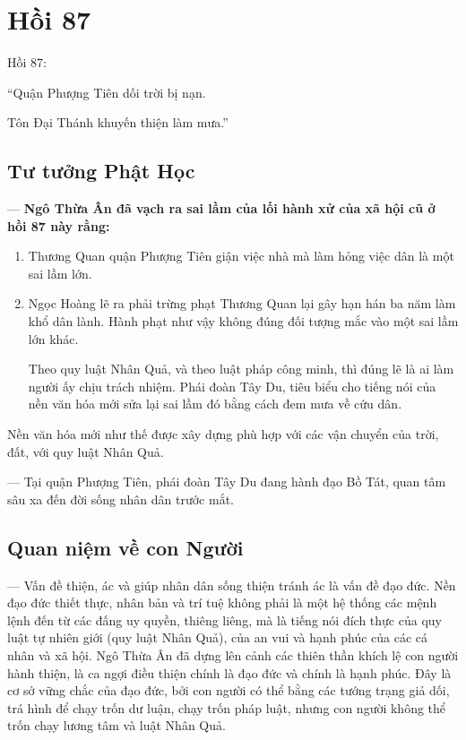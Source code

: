 \chapter{Hồi 87} %
\label{cha:hoi_87}

Hồi 87:

\begin{itshape}
``Quận Phượng Tiên dối trời bị nạn.

Tôn Đại Thánh khuyến thiện làm mưa.''
\end{itshape}

\section{Tư tưởng Phật Học} %
\label{sec:87_phat_hoc}

--- {\bf Ngô Thừa Ân đã vạch ra sai lầm của lối hành xử của xã hội cũ ở hồi 87 này rằng:}

\begin{enumerate}[label=\itshape\arabic*\upshape/]
    \item Thương Quan quận Phượng Tiên giận việc nhà mà làm hỏng việc dân là một sai lầm lớn.

    \item Ngọc Hoàng lẽ ra phải trừng phạt Thương Quan lại gây hạn hán ba năm làm khổ dân lành. Hành phạt như vậy không đúng đối tượng mắc vào một sai lầm lớn khác.

    Theo quy luật Nhân Quả, và theo luật pháp công minh, thì đúng lẽ là ai làm người ấy chịu trách nhiệm. Phái đoàn Tây Du, tiêu biểu cho tiếng nói của nền văn hóa mới sửa lại sai lầm đó bằng cách đem mưa về cứu dân.
\end{enumerate}

Nền văn hóa mới như thế được xây dựng phù hợp với các vận chuyển của trời, đất, với quy luật Nhân Quả.

--- Tại quận Phượng Tiên, phái đoàn Tây Du đang hành đạo Bồ Tát, quan tâm sâu xa đến đời sống nhân dân trước mắt.

\section{Quan niệm về con Người} %
\label{sec:87_con_nguoi}

--- Vấn đề thiện, ác và giúp nhân dân sống thiện tránh ác là vấn đề đạo đức. Nền đạo đức thiết thực, nhân bản và trí tuệ không phải là một hệ thống các mệnh lệnh đến từ các đấng uy quyền, thiêng liêng, mà là tiếng nói đích thực của quy luật tự nhiên giới (quy luật Nhân Quả), của an vui và hạnh phúc của các cá nhân và xã hội. Ngô Thừa Ân đã dựng lên cảnh các thiên thần khích lệ con người hành thiện, là ca ngợi điều thiện chính là đạo đức và chính là hạnh phúc. Đây là cơ sở vững chắc của đạo đức, bởi con người có thể bằng các tướng trạng giả dối, trá hình để chạy trốn dư luận, chạy trốn pháp luật, nhưng con người không thể trốn chạy lương tâm và luật Nhân Quả.


